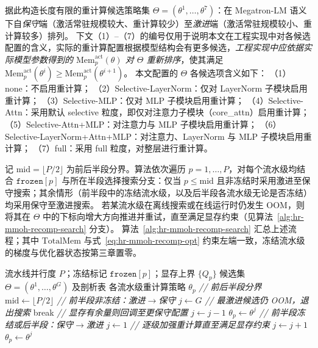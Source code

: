 据此构造长度有限的重计算候选策略集 $\Theta=(\theta^{1},\ldots,\theta^{7})$：在 Megatron-LM 语义下自\emph{保守}端（激活常驻规模较大、重计算较少）至\emph{激进}端（激活常驻规模较小、重计算较多）排列。
下文（1）--（7）的编号仅用于说明本文在工程实现中对各候选配置的含义，实际的重计算配置根据模型结构会有更多候选，\emph{工程实现中应依据实际模型参数得到的 $\mathrm{Mem}_p^{\mathrm{act}}(\theta)$ 对 $\Theta$ 重新排序}，使其满足 $\mathrm{Mem}_p^{\mathrm{act}}(\theta^{i})\ge \mathrm{Mem}_p^{\mathrm{act}}(\theta^{i+1})$。
本文配置的 $\Theta$ 各候选项含义如下：
（1）none：不启用重计算；
（2）Selective-LayerNorm：仅对 LayerNorm 子模块启用重计算；
（3）Selective-MLP：仅对 MLP 子模块启用重计算；
（4）Selective-Attn：采用默认 selective 粒度，即仅对注意力子模块（core\_attn）启用重计算；
（5）Selective-Attn+MLP：对注意力与 MLP 子模块启用重计算；
（6）Selective-LayerNorm+Attn+MLP：对注意力、LayerNorm 与 MLP 子模块启用重计算；
（7）full：采用 full 粒度，对整层进行重计算。

记 $\mathrm{mid}=\lfloor P/2\rfloor$ 为前后半段分界。算法依次遍历 $p=1,\ldots,P$，对每个流水级均结合 $\texttt{frozen}[p]$ 与所在半段选择搜索分支：仅当 $p\le \mathrm{mid}$ 且非冻结时采用激进至保守搜索；其余情形（前半段中的冻结流水级，以及后半段各流水级无论是否冻结）均采用保守至激进搜索。
若某流水级在离线搜索或在线运行时仍发生 OOM，则将其在 $\Theta$ 中的下标向增大方向推进并重试，直至满足显存约束（见算法~\ref{alg:hr-mmoh-recomp-search} 分支）。
算法~\ref{alg:hr-mmoh-recomp-search} 汇总上述流程；其中 $\mathrm{TotalMem}$ 与式~\eqref{eq:hr-mmoh-recomp-opt} 约束左端一致，冻结流水级的梯度与优化器状态按第三章置零。

\begin{algorithm}[t]
  \caption{HR-MMoH 多路分支重计算配置搜索}
  \label{alg:hr-mmoh-recomp-search}
  \footnotesize
  \renewcommand{\algorithmicrequire}{\textbf{输入:}}
  \renewcommand{\algorithmicensure}{\textbf{输出:}}
  \newcommand{\AlgComment}[1]{\STATE \textit{// #1}}
  \begin{algorithmic}[1]
    \REQUIRE 流水线并行度 $P$；冻结标记 $\texttt{frozen}[p]$；显存上界 $\{Q_p\}$
    \REQUIRE 候选集 $\Theta=(\theta^{1},\ldots,\theta^{G})$ 及剖析表
    \ENSURE 各流水级重计算策略 $\theta_p$
    \AlgComment{前后半段分界}
    \STATE $\mathrm{mid} \gets \lfloor P/2 \rfloor$
        \AlgComment{前半段非冻结：激进$\to$保守}
        \STATE $j \gets G$
          \AlgComment{最激进候选仍 OOM，退出搜索}
          \STATE break
        \ELSE
          \AlgComment{显存有余量则回调至更保守配置}
            \STATE $j \gets j-1$
          \ENDWHILE
          \STATE $\theta_p \gets \theta^{j}$
        \ENDIF
      \ELSE
        \AlgComment{前半段冻结或后半段：保守$\to$激进}
        \STATE $j \gets 1$
        \AlgComment{逐级加强重计算直至满足显存约束}
          \STATE $j \gets j+1$
        \ENDWHILE
        \STATE $\theta_p \gets \theta^{j}$
      \ENDIF
    \ENDFOR
  \end{algorithmic}
\end{algorithm}


